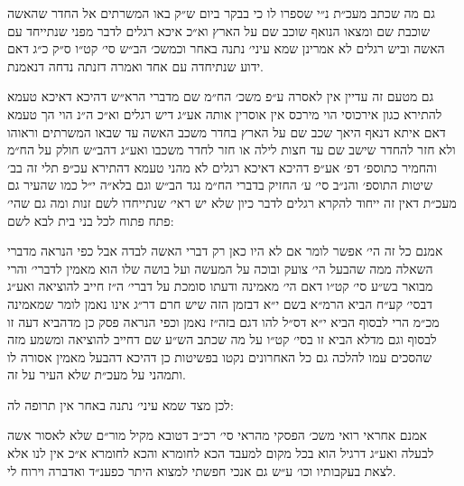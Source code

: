 \documentclass[12pt, openany]{book}
\begin{document}
\begin{multicols}{2}
גם מה שכתב מעכ״ת נ״י שספרו לו כי בבקר ביום ש״ק באו המשרתים אל החדר שהאשה שוכבת שם ומצאו הנואף שוכב שם על הארץ וא״כ איכא רגלים לדבר מפני שנתייחד עם האשה וביש רגלים לא אמרינן שמא עיני׳ נתנה באחר וכמשכ׳ הב״ש סי׳ קט״ו ס״ק כ״ג דאם ידוע שנתיחדה עם אחד ואמרה דזנתה נדחה דנאמנת.\\\vspace{0pt}

גם מטעם זה עדיין אין לאסרה ע״פ משכ׳ הח״מ שם מדברי הרא״ש דהיכא דאיכא טעמא להתירא כגון אירכוסי הוי מירכס אין אוסרין אותה אע״ג דיש רגלים וא״כ ה״נ הוי הך טעמא דאם איתא דנאף היאך שכב שם על הארץ בחדר משכב האשה עד שבאו המשרתים וראוהו ולא חזר להחדר שישב שם עד חצות לילה או חזר לחדר משכבו ואע״ג דהב״ש חולק על הח״מ והחמיר כתוספ׳ דפ׳ אע״פ דהיכא דאיכא רגלים לא מהני טעמא דהתירא עכ״פ תלי זה בב׳ שיטות התוספ׳ והנ״ב סי׳ ע׳ החזיק בדברי הח״מ נגד הב״ש וגם בלא״ה י״ל כמו שהעיר גם מעכ״ת דאין זה ייחוד להקרא רגלים לדבר כיון שלא יש ראי׳ שנתייחדו לשם זנות ומה גם שהי׳ פתח פתוח לכל בני בית לבא לשם:\\\vspace{0pt}

אמנם כל זה הי׳ אפשר לומר אם לא היו כאן רק דברי האשה לבדה אבל כפי הנראה מדברי השאלה ממה שהבעל הי׳ צועק ובוכה על המעשה ועל בושה שלו הוא מאמין לדברי׳ והרי מבואר בש״ע סי׳ קט״ו דאם הי׳ מאמינה ודעתו סומכת על דברי׳ ה״ז חייב להוציאה ואע״ג דבסי׳ קע״ח הביא הרמ״א בשם י״א דבזמן הזה שיש חרם דר״ג אינו נאמן לומר שמאמינה מכ״מ הרי לבסוף הביא י״א דס״ל להו דגם בזה״ז נאמן וכפי הנראה פסק כן מדהביא דעה זו לבסוף וגם מדלא הביא זו בסי׳ קט״ו על מה שכתב הש״ע שם דחייב להוציאה ומשמע מזה שהסכים עמו להלכה גם כל האחרונים נקטו בפשיטות כן דהיכא דהבעל מאמין אסורה לו ותמהני על מעכ״ת שלא העיר על זה.\\\vspace{0pt}

לכן מצד שמא עיני׳ נתנה באחר אין תרופה לה:\\\vspace{0pt}

אמנם אחראי רואי משכ׳ הפסקי מהראי סי׳ רכ״ב דטובא מקיל מור״ם שלא לאסור אשה לבעלה ואע״ג דרגיל הוא בכל מקום למעבד הכא לחומרא והכא לחומרא א״כ אין לנו אלא לצאת בעקבותיו וכו׳ ע״ש גם אנכי חפשתי למצוא היתר כפענ״ד ואדברה וירוח לי.\\\vspace{0pt}


\end{multicols}
\end{document}
